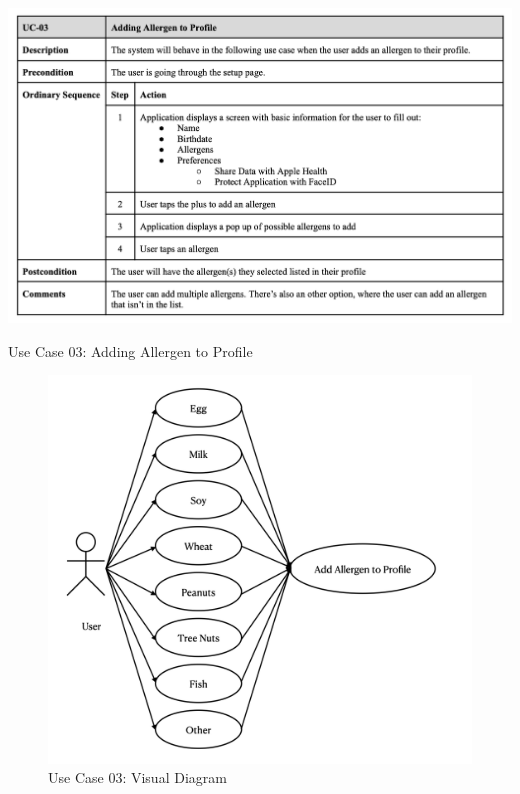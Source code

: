 \begin{table} [H]
    \centering
    \includegraphics[width=1\linewidth]{thesis//chapters//images/uc-03.png}
    \caption{Use Case 03: Adding Allergen to Profile}
    \label{fig:uc03-table}
\end{table}

\begin{figure} [H]
    \centering
    \includegraphics[width=0.75\linewidth]{thesis//chapters//images/uc-03-visual.png}
    \caption{Use Case 03: Visual Diagram}
    \label{fig:uc03-visual-diagram}
\end{figure}

